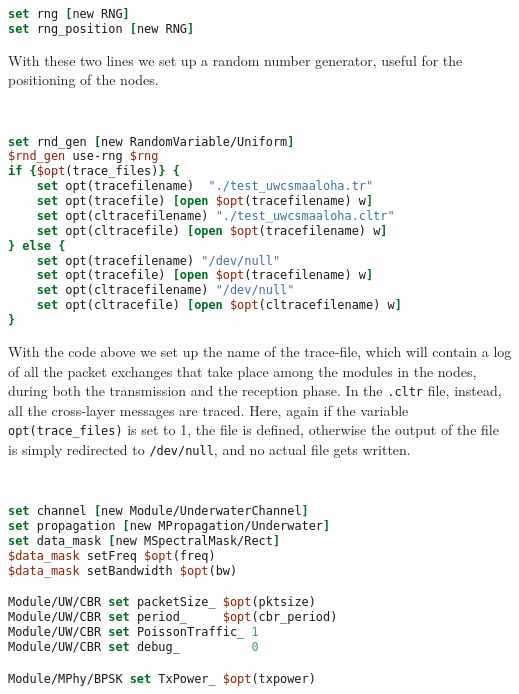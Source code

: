 \documentclass[11pt]{article}
\begin{document}
{\scriptsize
\begin{lstlisting}[language=tcl]
set rng [new RNG]
set rng_position [new RNG]
\end{lstlisting}
}

With these two lines we set up a random number generator, useful for the positioning of the nodes.

\clearpage

{\scriptsize\tt
\begin{lstlisting}[language=tcl]
set rnd_gen [new RandomVariable/Uniform]
$rnd_gen use-rng $rng
if {$opt(trace_files)} {
    set opt(tracefilename) 	"./test_uwcsmaaloha.tr"
    set opt(tracefile) [open $opt(tracefilename) w]
    set opt(cltracefilename) "./test_uwcsmaaloha.cltr"
    set opt(cltracefile) [open $opt(tracefilename) w]
} else {
    set opt(tracefilename) "/dev/null"
    set opt(tracefile) [open $opt(tracefilename) w]
    set opt(cltracefilename) "/dev/null"
    set opt(cltracefile) [open $opt(cltracefilename) w]
}

\end{lstlisting}
}
With the code above we set up the name of the trace-file, which will contain a log of all the packet exchanges that take place among the modules in the nodes, during both the transmission and the reception phase.
In the {\tt .cltr} file, instead, all the cross-layer messages are traced.
Here, again if the variable {\tt opt(trace\_files)} is set to 1, the file is defined, otherwise the output of the file is simply redirected to {\tt /dev/null}, and no actual file gets written.\\

{\scriptsize\tt
\begin{lstlisting}[language=tcl]
set channel [new Module/UnderwaterChannel]
set propagation [new MPropagation/Underwater]
set data_mask [new MSpectralMask/Rect]
$data_mask setFreq $opt(freq)
$data_mask setBandwidth $opt(bw)

Module/UW/CBR set packetSize_ $opt(pktsize)
Module/UW/CBR set period_     $opt(cbr_period)
Module/UW/CBR set PoissonTraffic_ 1
Module/UW/CBR set debug_          0

Module/MPhy/BPSK set TxPower_ $opt(txpower)
\end{lstlisting}
}
\end{document}
